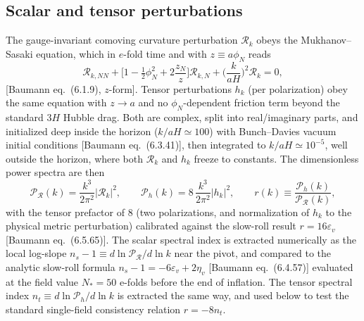 \documentclass[11pt]{article}
\begin{document}
\subsection{Scalar and tensor perturbations}
The gauge-invariant comoving curvature perturbation $\mathcal{R}_k$ obeys the
Mukhanov--Sasaki equation, which in $e$-fold time and with $z\equiv a\phi_N$ reads
\begin{equation}
\mathcal{R}_{k,NN}+\Big[1-\tfrac12\phi_N^2+2\frac{z_N}{z}\Big]\mathcal{R}_{k,N}
+\Big(\frac{k}{aH}\Big)^2\mathcal{R}_k=0,
\label{eq:ms-scalar}
\end{equation}
[Baumann eq.\ (6.1.9), $z$-form]. Tensor perturbations $h_k$ (per polarization) obey the
same equation with $z\to a$ and no $\phi_N$-dependent friction term beyond the standard
$3H$ Hubble drag. Both are complex, split into real/imaginary parts, and initialized deep
inside the horizon ($k/aH\simeq100$) with Bunch--Davies vacuum initial conditions
[Baumann eq.\ (6.3.41)], then integrated to $k/aH\simeq10^{-5}$, well outside the horizon,
where both $\mathcal{R}_k$ and $h_k$ freeze to constants. The dimensionless power spectra
are then
\begin{equation}
\mathcal{P}_\mathcal{R}(k)=\frac{k^3}{2\pi^2}|\mathcal{R}_k|^2,\qquad
\mathcal{P}_h(k)=8\,\frac{k^3}{2\pi^2}|h_k|^2,\qquad
r(k)\equiv\frac{\mathcal{P}_h(k)}{\mathcal{P}_\mathcal{R}(k)},
\label{eq:spectra}
\end{equation}
with the tensor prefactor of 8 (two polarizations, and normalization of $h_k$ to the
physical metric perturbation) calibrated against the slow-roll result $r=16\varepsilon_v$
[Baumann eq.\ (6.5.65)]. The scalar spectral index is extracted numerically as the local
log-slope $n_s-1\equiv d\ln\mathcal{P}_\mathcal{R}/d\ln k$ near the pivot, and compared to
the analytic slow-roll formula $n_s-1=-6\varepsilon_v+2\eta_v$ [Baumann eq.\ (6.4.57)]
evaluated at the field value $N_*=50$ e-folds before the end of inflation. The tensor
spectral index $n_t\equiv d\ln\mathcal{P}_h/d\ln k$ is extracted the same way, and used
below to test the standard single-field consistency relation $r=-8n_t$.
\end{document}
